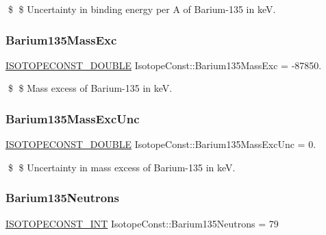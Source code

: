 \$ \$ Uncertainty in binding energy per A of Barium-\/135 in keV. \mbox{\label{group___isotope_const-_barium-_ba135_ga2efc21cc9fb03fc73be2db7c5ea0b5ed}} 
\subsubsection{\texorpdfstring{Barium135\+Mass\+Exc}{Barium135MassExc}}
{\footnotesize\ttfamily \mbox{\hyperlink{group___isotope_const-_macros_ga8f45a7272ce02c0b4c65c44636ed719a}{I\+S\+O\+T\+O\+P\+E\+C\+O\+N\+S\+T\+\_\+\+D\+O\+U\+B\+LE}} Isotope\+Const\+::\+Barium135\+Mass\+Exc = -\/87850.}

\$ \$ Mass excess of Barium-\/135 in keV. \mbox{\label{group___isotope_const-_barium-_ba135_ga2cabb3d4927cf255559593b7dc84a682}} 
\subsubsection{\texorpdfstring{Barium135\+Mass\+Exc\+Unc}{Barium135MassExcUnc}}
{\footnotesize\ttfamily \mbox{\hyperlink{group___isotope_const-_macros_ga8f45a7272ce02c0b4c65c44636ed719a}{I\+S\+O\+T\+O\+P\+E\+C\+O\+N\+S\+T\+\_\+\+D\+O\+U\+B\+LE}} Isotope\+Const\+::\+Barium135\+Mass\+Exc\+Unc = 0.}

\$ \$ Uncertainty in mass excess of Barium-\/135 in keV. \mbox{\label{group___isotope_const-_barium-_ba135_ga61e3534ba08ed137f933554ca0fba307}} 
\subsubsection{\texorpdfstring{Barium135\+Neutrons}{Barium135Neutrons}}
{\footnotesize\ttfamily \mbox{\hyperlink{group___isotope_const-_macros_ga5f18360b3e99483a35c32d789e62621c}{I\+S\+O\+T\+O\+P\+E\+C\+O\+N\+S\+T\+\_\+\+I\+NT}} Isotope\+Const\+::\+Barium135\+Neutrons = 79}

